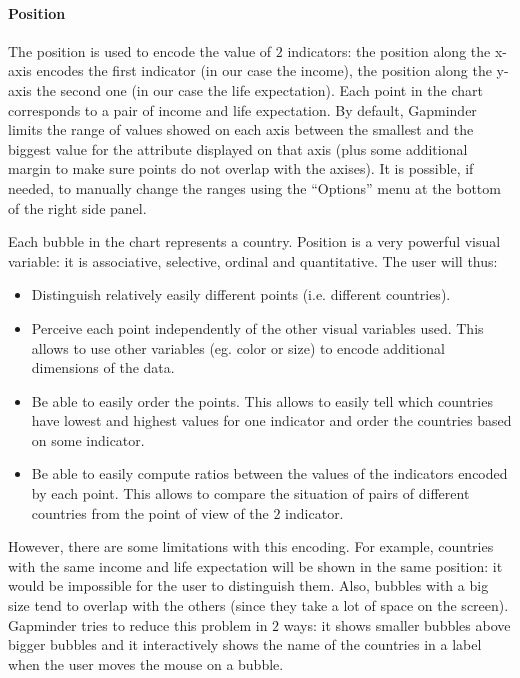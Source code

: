 \paragraph{Position}
The position is used to encode the value of $2$ indicators:
the position along the x-axis encodes the first indicator (in our case the income), the position along the y-axis the second one (in our case the life expectation).
Each point in the chart corresponds to a pair of income and life expectation.
By default, Gapminder limits the range of values showed on each axis between the smallest and the biggest value for the attribute displayed on that axis (plus some additional margin to make sure points do not overlap with the axises).
It is possible, if needed, to manually change the ranges using the ``Options'' menu at the bottom of the right side panel.

Each bubble in the chart represents a country.
Position is a very powerful visual variable: it is associative, selective, ordinal and quantitative.
The user will thus:
\begin{itemize}
    \item Distinguish relatively easily different points (i.e. different countries).
    \item Perceive each point independently of the other visual variables used. This allows to use other variables (eg. color or size) to encode additional dimensions of the data.
    \item Be able to easily order the points. This allows to easily tell which countries have lowest and highest values for one indicator and order the countries based on some indicator.
    \item Be able to easily compute ratios between the values of the indicators encoded by each point. This allows to compare the situation of pairs of different countries from the point of view of the $2$ indicator.
\end{itemize}

However, there are some limitations with this encoding.
For example, countries with the same income and life expectation will be shown in the same position:
it would be impossible for the user to distinguish them.
Also, bubbles with a big size tend to overlap with the others (since they take a lot of space on the screen).
Gapminder tries to reduce this problem in $2$ ways:
it shows smaller bubbles above bigger bubbles and it interactively shows the name of the countries in a label when the user moves the mouse on a bubble.

